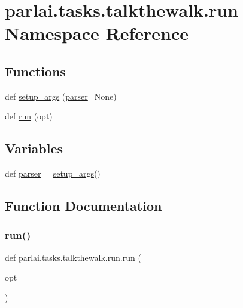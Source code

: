 \hypertarget{namespaceparlai_1_1tasks_1_1talkthewalk_1_1run}{}\section{parlai.\+tasks.\+talkthewalk.\+run Namespace Reference}
\label{namespaceparlai_1_1tasks_1_1talkthewalk_1_1run}
\subsection*{Functions}
\begin{DoxyCompactItemize}
\item 
def \hyperlink{namespaceparlai_1_1tasks_1_1talkthewalk_1_1run_a3534e8afa0a4dc25a6e02740fa35ac84}{setup\+\_\+args} (\hyperlink{namespaceparlai_1_1tasks_1_1talkthewalk_1_1run_ae9970664deea071fd837c1d8052c9025}{parser}=None)
\item 
def \hyperlink{namespaceparlai_1_1tasks_1_1talkthewalk_1_1run_a0a1ec08b8196cb008e4df83468c67e5b}{run} (opt)
\end{DoxyCompactItemize}
\subsection*{Variables}
\begin{DoxyCompactItemize}
\item 
def \hyperlink{namespaceparlai_1_1tasks_1_1talkthewalk_1_1run_ae9970664deea071fd837c1d8052c9025}{parser} = \hyperlink{namespaceparlai_1_1tasks_1_1talkthewalk_1_1run_a3534e8afa0a4dc25a6e02740fa35ac84}{setup\+\_\+args}()
\end{DoxyCompactItemize}


\subsection{Function Documentation}
\mbox{\label{namespaceparlai_1_1tasks_1_1talkthewalk_1_1run_a0a1ec08b8196cb008e4df83468c67e5b}} 
\subsubsection{\texorpdfstring{run()}{run()}}
{\footnotesize\ttfamily def parlai.\+tasks.\+talkthewalk.\+run.\+run (\begin{DoxyParamCaption}\item[{}]{opt }\end{DoxyParamCaption})}

